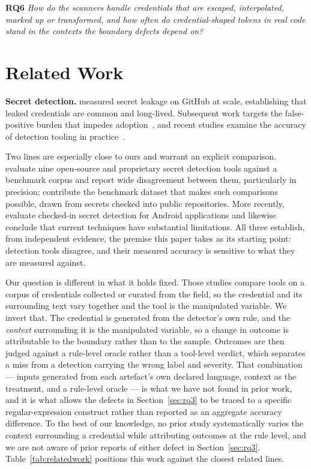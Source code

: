 \documentclass[pdflatex,sn-basic]{sn-jnl}
\newcommand{\researchq}[1]{\textbf{RQ#1}}
\begin{document}
\noindent\researchq{6} \emph{How do the scanners handle credentials that are escaped, interpolated, marked up or transformed, and how often do credential-shaped tokens in real code stand in the contexts the boundary defects depend on?}

\section{Related Work}

\textbf{Secret detection.} \citet{meli2019} measured secret leakage on GitHub at scale, establishing that leaked credentials are common and long-lived. Subsequent work targets the false-positive burden that impedes adoption~\citep{saha2020,rahman2019}, and recent studies examine the accuracy of detection tooling in practice~\citep{basak2022}.

Two lines are especially close to ours and warrant an explicit comparison. \citet{basak2023comparative} evaluate nine open-source and proprietary secret detection tools against a benchmark corpus and report wide disagreement between them, particularly in precision; \citet{basak2023secretbench} contribute the benchmark dataset that makes such comparisons possible, drawn from secrets checked into public repositories. More recently, \citet{li2025android} evaluate checked-in secret detection for Android applications and likewise conclude that current techniques have substantial limitations. All three establish, from independent evidence, the premise this paper takes as its starting point: detection tools disagree, and their measured accuracy is sensitive to what they are measured against.

Our question is different in what it holds fixed. Those studies compare tools on a corpus of credentials collected or curated from the field, so the credential and its surrounding text vary together and the tool is the manipulated variable. We invert that. The credential is generated from the detector's own rule, and the \emph{context} surrounding it is the manipulated variable, so a change in outcome is attributable to the boundary rather than to the sample. Outcomes are then judged against a rule-level oracle rather than a tool-level verdict, which separates a miss from a detection carrying the wrong label and severity. That combination --- inputs generated from each artefact's own declared language, context as the treatment, and a rule-level oracle --- is what we have not found in prior work, and it is what allows the defects in Section~\ref{sec:rq3} to be traced to a specific regular-expression construct rather than reported as an aggregate accuracy difference. To the best of our knowledge, no prior study systematically varies the context surrounding a credential while attributing outcomes at the rule level, and we are not aware of prior reports of either defect in Section~\ref{sec:rq3}. Table~\ref{tab:relatedwork} positions this work against the closest related lines.
\end{document}
